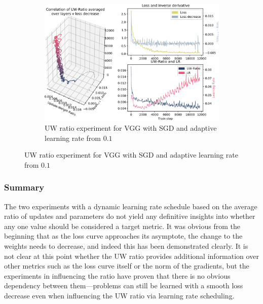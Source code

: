 \begin{figure}

    \begin{subfigure}{\textwidth}
        \centering
        \includegraphics[width=\linewidth]{gfx/diagrams/experiments/ratio_loss_correlation/vgg_sgd_01_0_11700_ratio_schedule.pdf}
        \caption{UW ratio experiment for VGG with SGD and adaptive learning rate
            from $0.1$}
        \label{fig:ratio_loss_corr_vgg_sgd_01_adaptive}
    \end{subfigure}
\end{figure}

\subsubsection{Summary}

The two experiments with a dynamic learning rate schedule based on the average
ratio of updates and parameters do not yield any definitive insights into
whether any one value should be considered a target metric. It was obvious from
the beginning that as the loss curve approaches its asymptote, the change to the
weights needs to decrease, and indeed this has been demonstrated clearly. It is
not clear at this point whether the UW ratio provides additional information
over other metrics such as the loss curve itself or the norm of the gradients,
but the experiments in influencing the ratio have proven that there is no
obvious dependency between them---problems can still be learned with a smooth
loss decrease even when influencing the UW ratio via learning rate scheduling.

